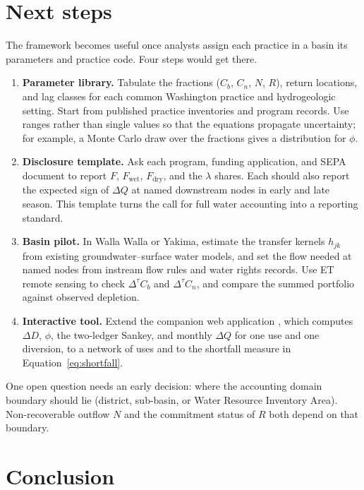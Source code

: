 \documentclass[11pt]{article}
\newcommand{\Cb}{C_b}                       %
\newcommand{\Cn}{C_n}                       %
\newcommand{\Fwet}{F_{\mathrm{wet}}}        %
\newcommand{\Fdry}{F_{\mathrm{dry}}}        %
\newcommand{\dtau}{\Delta^{\tau}}            %
\begin{document}
\section{Next steps}\label{sec:next}

The framework becomes useful once analysts assign each practice in a basin its parameters and practice code. Four steps would get there.
\begin{enumerate}
  \item \textbf{Parameter library.} Tabulate the fractions ($\Cb$, $\Cn$, $N$, $R$), return locations, and lag classes for each common Washington practice and hydrogeologic setting. Start from published practice inventories and program records. Use ranges rather than single values so that the equations propagate uncertainty; for example, a Monte Carlo draw over the fractions gives a distribution for $\phi$.
  \item \textbf{Disclosure template.} Ask each program, funding application, and SEPA document to report $F$, $\Fwet$, $\Fdry$, and the $\lambda$ shares. Each should also report the expected sign of $\Delta Q$ at named downstream nodes in early and late season. This template turns the call for full water accounting \citep{grafton2018} into a reporting standard.
  \item \textbf{Basin pilot.} In Walla Walla or Yakima, estimate the transfer kernels $h_{jk}$ from existing groundwater--surface water models, and set the flow needed at named nodes from instream flow rules and water rights records. Use ET remote sensing to check $\dtau \Cb$ and $\dtau \Cn$, and compare the summed portfolio against observed depletion.
  \item \textbf{Interactive tool.} Extend the companion web application \citep{yoder2026ledger}, which computes $\Delta D$, $\phi$, the two-ledger Sankey, and monthly $\Delta Q$ for one use and one diversion, to a network of uses and to the shortfall measure in Equation~\eqref{eq:shortfall}.
\end{enumerate}
One open question needs an early decision: where the accounting domain boundary should lie (district, sub-basin, or Water Resource Inventory Area). Non-recoverable outflow $N$ and the commitment status of $R$ both depend on that boundary.

\section{Conclusion}\label{sec:conclusion}
\end{document}
